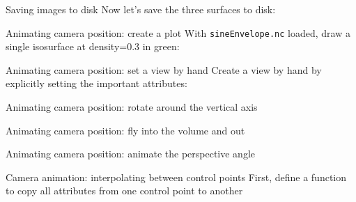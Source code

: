 \begin{frame}{Saving images to disk}
  \writeToDisk\pause
  Now let's save the three surfaces to disk:
  
\end{frame}

\begin{frame}{Animating camera position: create a plot}
  With \texttt{sineEnvelope.nc} loaded, draw a single isosurface at density=0.3 in green:
  
    \pause
  
\end{frame}

\begin{frame}{Animating camera position: set a view by hand}
  Create a view by hand by explicitly setting the important attributes:
  
\end{frame}

\begin{frame}{Animating camera position: rotate around the vertical axis}
  
\end{frame}

\begin{frame}{Animating camera position: fly into the volume and out}
  
\end{frame}

\begin{frame}{Animating camera position: animate the perspective angle}
  
\end{frame}

\begin{frame}{Camera animation: interpolating between control points}
  First, define a function to copy all attributes from one control point to another
  
\end{frame}

